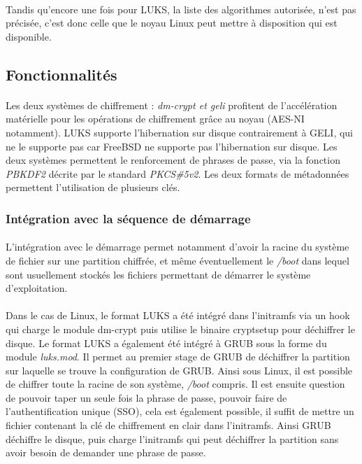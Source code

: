 \paragraph{}
Tandis qu'encore une fois pour LUKS, la liste des algorithmes autorisée, n'est 
pas précisée, c'est donc celle que le noyau Linux peut mettre à disposition 
qui est disponible.

\subsection{Fonctionnalités}
\paragraph{}
Les deux systèmes de chiffrement : {\em dm-crypt \em et \em geli} profitent 
de l'accélération matérielle pour les opérations de chiffrement grâce au 
noyau (AES-NI notamment). LUKS supporte l'hibernation sur disque 
contrairement à GELI, qui ne le supporte pas car FreeBSD ne supporte pas 
l'hibernation sur disque. Les deux systèmes permettent le renforcement de 
phrases de passe, via la fonction {\em PBKDF2} décrite par le standard 
{\em PKCS\#5v2}. Les deux formats de métadonnées permettent l'utilisation de 
plusieurs clés.

\subsubsection{Intégration avec la séquence de démarrage}
\paragraph{}
L'intégration avec le démarrage permet notamment d'avoir la racine du système 
de fichier sur une partition chiffrée, et même éventuellement le {\em /boot}
dans lequel sont usuellement stockés les fichiers permettant de démarrer le 
système d'exploitation.

\paragraph{}
Dans le cas de Linux, le format LUKS a été intégré dans l'initramfs via un
hook qui charge le module dm-crypt puis utilise le binaire cryptsetup pour 
déchiffrer le disque. Le format LUKS a également été intégré à GRUB sous la 
forme du module {\em luks.mod}. Il permet au premier stage de GRUB de 
déchiffrer la partition sur laquelle se trouve la configuration de GRUB.
Ainsi sous Linux, il est possible de chiffrer toute la racine de son système,
{\em /boot} compris. Il est ensuite question de pouvoir taper un seule fois la 
phrase de passe, pouvoir faire de l'authentification unique (SSO), cela est 
également possible, il suffit de mettre un fichier contenant la clé de 
chiffrement en clair dans l'initramfs. Ainsi GRUB déchiffre le disque, 
puis charge l'initramfs qui peut déchiffrer la partition sans avoir besoin 
de demander une phrase de passe.

